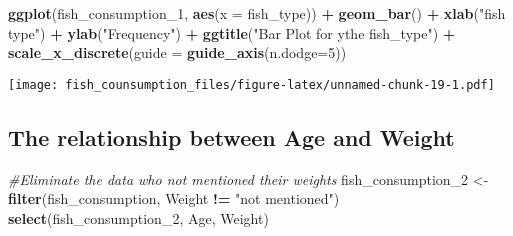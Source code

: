 \documentclass[
]{article}
\newenvironment{Shaded}{\begin{snugshade}}{\end{snugshade}}
\newcommand{\AttributeTok}[1]{\textcolor[rgb]{0.13,0.29,0.53}{#1}}
\newcommand{\CommentTok}[1]{\textcolor[rgb]{0.56,0.35,0.01}{\textit{#1}}}
\newcommand{\DecValTok}[1]{\textcolor[rgb]{0.00,0.00,0.81}{#1}}
\newcommand{\FunctionTok}[1]{\textcolor[rgb]{0.13,0.29,0.53}{\textbf{#1}}}
\newcommand{\NormalTok}[1]{#1}
\newcommand{\OtherTok}[1]{\textcolor[rgb]{0.56,0.35,0.01}{#1}}
\newcommand{\SpecialCharTok}[1]{\textcolor[rgb]{0.81,0.36,0.00}{\textbf{#1}}}
\newcommand{\StringTok}[1]{\textcolor[rgb]{0.31,0.60,0.02}{#1}}
\begin{document}
\begin{Shaded}
\begin{Highlighting}[]
\FunctionTok{ggplot}\NormalTok{(fish\_consumption\_1, }\FunctionTok{aes}\NormalTok{(}\AttributeTok{x =}\NormalTok{ fish\_type)) }\SpecialCharTok{+}
  \FunctionTok{geom\_bar}\NormalTok{() }\SpecialCharTok{+}
  \FunctionTok{xlab}\NormalTok{(}\StringTok{"fish type"}\NormalTok{) }\SpecialCharTok{+}
  \FunctionTok{ylab}\NormalTok{(}\StringTok{"Frequency"}\NormalTok{) }\SpecialCharTok{+}
  \FunctionTok{ggtitle}\NormalTok{(}\StringTok{"Bar Plot for ythe fish\_type"}\NormalTok{) }\SpecialCharTok{+} \FunctionTok{scale\_x\_discrete}\NormalTok{(}\AttributeTok{guide =} \FunctionTok{guide\_axis}\NormalTok{(}\AttributeTok{n.dodge=}\DecValTok{5}\NormalTok{))}
\end{Highlighting}
\end{Shaded}

\texttt{[image: fish\_counsumption\_files/figure-latex/unnamed-chunk-19-1.pdf]}

\hypertarget{the-relationship-between-age-and-weight}{%
\subsection{The relationship between Age and
Weight}\label{the-relationship-between-age-and-weight}}

\begin{Shaded}
\begin{Highlighting}[]
\CommentTok{\#Eliminate the data who not mentioned their weights}
\NormalTok{fish\_consumption\_2 }\OtherTok{\textless{}{-}} \FunctionTok{filter}\NormalTok{(fish\_consumption, Weight }\SpecialCharTok{!=} \StringTok{"not mentioned"}\NormalTok{)}
                         \FunctionTok{select}\NormalTok{(fish\_consumption\_2, Age, Weight)}
\end{Highlighting}
\end{Shaded}
\end{document}
